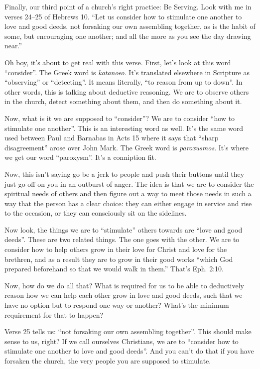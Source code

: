 \documentclass[letterpaper, 12pt]{article}
\begin{document}
    Finally, our third point of a church's right practice: Be Serving.
    Look with me in verses 24--25 of Hebrews 10. ``Let us consider how
    to stimulate one another to love and good deeds, not forsaking our
    own assembling together, as is the habit of some, but encouraging
    one another; and all the more as you see the day drawing near.''

    Oh boy, it's about to get real with this verse. First, let's look at
    this word ``consider''. The Greek word is \emph{katanoeo}. It's
    translated elsewhere in Scripture as ``observing'' or ``detecting''.
    It means literally, ``to reason from up to down''. In other words,
    this is talking about deductive reasoning. We are to observe others
    in the church, detect something about them, and then do something
    about it.

    Now, what is it we are supposed to ``consider''? We are to consider
    ``how to stimulate one another''. This is an interesting word as
    well. It's the same word used between Paul and Barnabas in Acts 15
    where it says that ``sharp disagreement'' arose over John Mark. The
    Greek word is \emph{paroxusmos}. It's where we get our word
    ``paroxysm''. It's a conniption fit.

    Now, this isn't saying go be a jerk to people and push their buttons
    until they just go off on you in an outburst of anger. The idea is
    that we are to consider the spiritual needs of others and then
    figure out a way to meet those needs in such a way that the person
    has a clear choice: they can either engage in service and rise to
    the occasion, or they can consciously sit on the sidelines.

    Now look, the things we are to ``stimulate'' others towards are
    ``love and good deeds''. These are two related things. The one goes
    with the other. We are to consider how to help others grow in their
    love for Christ and love for the brethren, and as a result they are
    to grow in their good works ``which God prepared beforehand so that
    we would walk in them.'' That's Eph. 2:10.

    Now, how do we do all that? What is required for us to be able to
    deductively reason how we can help each other grow in love and good
    deeds, such that we have no option but to respond one way or
    another? What's the minimum requirement for that to happen?

    Verse 25 tells us: ``not forsaking our own assembling together''.
    This should make sense to us, right? If we call ourselves
    Christians, we are to ``consider how to stimulate one another to
    love and good deeds''. And you can't do that if you have forsaken
    the church, the very people you are supposed to stimulate.
\end{document}
